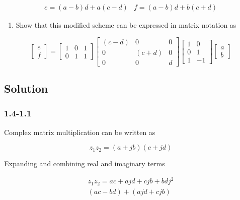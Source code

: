 \documentclass[11pt,a4paper,final]{article}
\begin{document}
\begin{equation*}
\begin{array}{cc}
e = (a-b)d + a(c-d) & f = (a-b)d + b(c+d)
\end{array}
\end{equation*}

\begin{enumerate}
\item Show that this modified scheme can be expressed in matrix notation as
\end{enumerate}

\begin{equation*}
\begin{bmatrix} e \\ f \end{bmatrix} =
\begin{bmatrix} 1 & 0 & 1 \\ 0 & 1 & 1 \end{bmatrix}
\begin{bmatrix}
(c-d) & 0 & 0 \\
0 & (c+d) & 0 \\
0 & 0 & d
\end{bmatrix}
\begin{bmatrix}
1 & 0 \\
0 & 1 \\
1 & -1
\end{bmatrix}
\begin{bmatrix} a \\ b \end{bmatrix}
\end{equation*}

\subsection{Solution}
\label{sec:orge0f75c1}

\subsubsection{1.4-1.1}
\label{sec:org1c45e43}
Complex matrix multiplication can be written as

$$
z_1 z_2 = (a+jb)(c+jd)
$$

Expanding and combining real and imaginary terms

\begin{equation*}
\begin{array}{c}
z_1 z_2 = ac + ajd + cjb + bdj^2 \\
(ac - bd) + (ajd + cjb)
\end{array}
\end{equation*}
\end{document}
